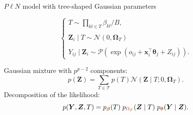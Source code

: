 \documentclass[11pt]{beamer}
\newcommand\betab{{\boldsymbol{\beta}}}
\newcommand\thetab{{\boldsymbol{\theta}}}
\newcommand\Omegab{{\boldsymbol{\Omega}}}
\newcommand\xb{{\boldsymbol{x}}}
\newcommand{\Ybf}{{\boldsymbol{Y}}}
\newcommand{\Zbf}{{\boldsymbol{Z}}}
\newcommand{\Pcal}{\mathcal{P}}
\newcommand{\emphase}[1]{\textcolor{Complement}{#1}}
\newcommand{\Ncal}{\mathcal{N}}
\begin{document}
 \begin{frame}{$P\ell N$ model with tree-shaped Gaussian parameters}
 
 \begin{equation*}
    \left\{\begin{array}{l}
 T\sim \prod_{kl\in T} \beta_{kl} / B, \\\\
 \Zbf_i\mid T  \sim \Ncal (0, \Omegab_T)\\\\
 Y_{ij}\mid \Zbf_i\sim \Pcal (\exp (o_{ij}+\xb_i^\intercal \thetab_j + Z_{ij})).
 \end{array}   \right.
 \end{equation*}
 \bigskip
 
 Gaussian mixture with $p^{p-2}$ components:
 $$p(\Zbf) = \sum_{T\in \mathcal{T}} p(T) \Ncal(\Zbf\mid T ; 0, \Omegab_T).$$
Decomposition of the likelihood:
 $$p(\Ybf, \Zbf,T)=p_{\emphase{\betab}}(T)\;p_{\emphase{\Omega_T}}(\Zbf\mid T)\;p_{\emphase{\thetab}}(\Ybf\mid \Zbf).$$
 \end{frame}
 
\end{document}
